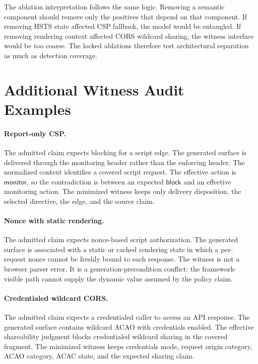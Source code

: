 \documentclass[10pt,conference]{IEEEtran}
\newcommand{\block}{\ensuremath{\mathsf{block}}}
\newcommand{\monitor}{\ensuremath{\mathsf{monitor}}}
\begin{document}
The ablation interpretation follows the same logic. Removing a semantic component should remove only the positives that depend on that component. If removing HSTS state affected CSP fallback, the model would be entangled. If removing rendering context affected CORS wildcard sharing, the witness interface would be too coarse. The locked ablations therefore test architectural separation as much as detection coverage.

\section{Additional Witness Audit Examples}

\paragraph{Report-only CSP.}
The admitted claim expects blocking for a script edge. The generated surface is delivered through the monitoring header rather than the enforcing header. The normalized context identifies a covered script request. The effective action is \monitor{}, so the contradiction is between an expected \block{} and an effective monitoring action. The minimized witness keeps only delivery disposition, the selected directive, the edge, and the source claim.

\paragraph{Nonce with static rendering.}
The admitted claim expects nonce-based script authorization. The generated surface is associated with a static or cached rendering state in which a per-request nonce cannot be freshly bound to each response. The witness is not a browser parser error. It is a generation-precondition conflict: the framework-visible path cannot supply the dynamic value assumed by the policy claim.

\paragraph{Credentialed wildcard CORS.}
The admitted claim expects a credentialed caller to access an API response. The generated surface contains wildcard ACAO with credentials enabled. The effective shareability judgment blocks credentialed wildcard sharing in the covered fragment. The minimized witness keeps credentials mode, request origin category, ACAO category, ACAC state, and the expected sharing claim.
\end{document}
